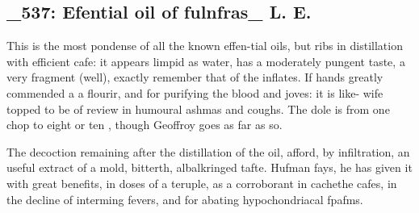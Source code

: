 \subsection*{\_537: Efential oil of fulnfras\_ L. E.}
This is the most pondense of all the known effen-tial oils, but ribs in distillation with efficient cafe: it appears limpid as water, has a moderately pungent taste, a very fragment (well), exactly remember that of the inflates. If hands greatly commended a a flourir, and for purifying the blood and joves: it is like- wife topped to be of review in humoural ashmas and coughs. The dole is from one chop to eight or ten , though Geoffroy goes as far as so.\par\medskip
The decoction remaining after the distillation of the oil, afford, by infiltration, an useful extract of a mold, bitterth, albalkringed tafte. Hufman fays, he has given it with great benefits, in doses of a teruple, as a corroborant in cachethe cafes, in the decline of interming fevers, and for abating hypochondriacal fpafms.\par\medskip
